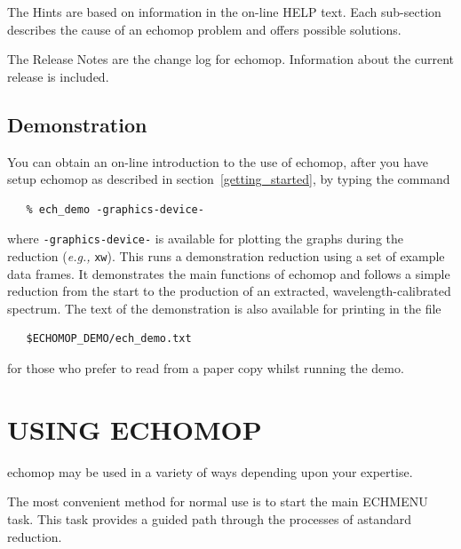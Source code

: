 \documentclass[11pt,twoside]{article}
\newcommand{\stardocinitials}  {SUN}
\newcommand{\stardocnumber}    {152.4}
\newcommand{\stardocname}{\stardocinitials /\stardocnumber}
\newcommand{\htmlref}[2]{#1}
\newcommand{\xlabel}[1]{}
\newcommand{\mlabel}[1]{\xlabel{#1}\label{#1}}
\newcommand{\sunspec}[2]{#1}
\renewcommand{\sunspec}[2]{#2}
\newcommand{\myindex}[1]{\index{#1}}
\renewcommand{\myindex}[1]{}
\begin{document}
\sunspec{Appendix~\ref{hints} is}
{The \htmlref{Hints}{hints} are}
based on information in the on-line HELP text.
Each sub-section describes the cause of an {\sc echomop} problem and offers
possible solutions.

\sunspec{Appendix~\ref{release_notes} is}
{The \htmlref{Release Notes}{release_notes} are} the change log for
{\sc echomop}.  Information about the current release is included.

\subsection{\mlabel{demonstration}Demonstration}

You can obtain an on-line introduction to the use of {\sc echomop},
after you have setup {\sc echomop} as described in
section~\ref{getting_started}, by typing the command

\begin{verbatim}
   % ech_demo -graphics-device-
\end{verbatim}

where {\tt -graphics-device-} is available for plotting the graphs
during the reduction ({\it{e.g.,}} \texttt{xw}). \myindex{Demonstration}
This runs a demonstration reduction using a set of example data
frames.  It demonstrates the main functions of {\sc echomop} and follows
a simple reduction from the start to the production of an extracted,
wavelength-calibrated spectrum.  The text of the demonstration is also
available for printing in the file

\begin{verbatim}
   $ECHOMOP_DEMO/ech_demo.txt
\end{verbatim}

for those who prefer to read from a paper copy whilst running the demo.


\section{\mlabel{using_echomop}USING ECHOMOP}
\markboth{USING {\sc echomop}}{\stardocname}
\myindex{Starting up}

{\sc echomop} may be used in a variety of ways depending upon your expertise.

The most convenient method for normal use is to start the main ECHMENU
task.
This task provides a guided path through the processes of a\sunspec{
`standard reduction' (see \S\ref{standard_steps})}{\htmlref{standard
reduction}{standard_steps}}.
\end{document}
